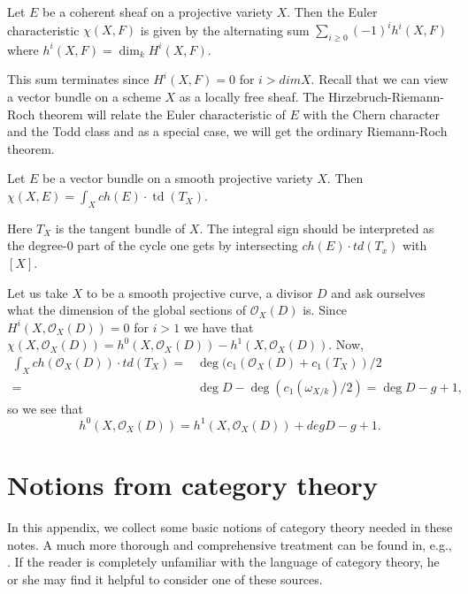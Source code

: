 \documentclass[a4paper,openany]{scrbook}
\begin{document}
\begin{defn}
Let $E$ be a coherent sheaf on a projective variety $X.$ Then the Euler characteristic $\chi(X,F)$ is given by the alternating sum $\sum_{i \geq 0} (-1)^i h^i(X,F)$ where $h^i(X,F)=\dim_k H^i(X,F).$
\end{defn}
This sum terminates since $H^i(X,F)=0$ for $i > dim X.$ Recall  that we can view a vector bundle on a scheme $X$ as a locally free sheaf. The Hirzebruch-Riemann-Roch theorem will relate the Euler characteristic of $E$ with the Chern character and the Todd class and as a special case, we will get the ordinary Riemann-Roch theorem.
\begin{thm} \label{thm:grothendieck-riemann-roch}
Let $E$ be a vector bundle on a smooth projective variety $X.$ Then $\chi(X,E) = \int_X ch(E) \cdot \operatorname{td}(T_X)$. 
\end{thm}
Here $T_X$ is the tangent bundle of $X.$ The integral sign should be interpreted as the degree-$0$ part of the cycle one gets by intersecting $ch(E) \cdot td(T_x)$ with $[X]$.

\begin{example}
Let us take $X$ to be a smooth projective curve, a divisor $D$ and ask ourselves what the dimension of the global sections of $\mathcal{O}_X(D)$ is. Since $H^i(X,\mathcal{O}_X(D)) = 0$ for $i > 1$ we have that $\chi(X,\mathcal{O}_X(D)) = h^0(X,\mathcal{O}_X(D)) - h^1(X,\mathcal{O}_X(D)).$ Now,
\begin{align*}
\int_X ch(\mathcal{O}_X(D)) \cdot td(T_X) = &\deg(c_1(\mathcal{O}_X(D)+c_1(T_X))/2\\
= & \deg D - \deg (c_1(\omega_{X/k})/2) = \deg D - g+1,
\end{align*}
so we see that
\[
h^0(X,\mathcal{O}_X(D)) = h^1(X,\mathcal{O}_X(D)) + deg D -g+1.
\]
\end{example}

\appendix

\chapter{Notions from category theory}

In this appendix, we collect some basic notions of category theory needed in these notes. A much more thorough and comprehensive treatment can be found in, e.g., \cite{maclane:cwm,borceux:volone}. If the reader is completely unfamiliar with the language of category theory, he or she may find it helpful to consider one of these sources.
\end{document}
